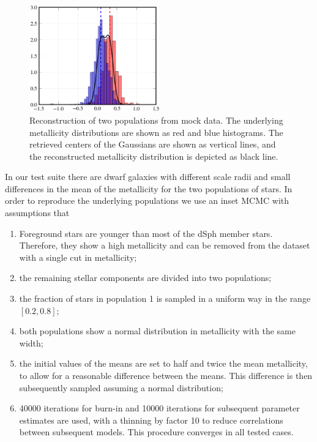 \begin{figure}
    \begin{center}
        \includegraphics[width=0.5\textwidth]{fig/pymcmetals}
        \caption{Reconstruction of two populations from mock data. The
          underlying metallicity distributions are shown as red and
          blue histograms. The retrieved centers of the Gaussians are
          shown as vertical lines, and the reconstructed metallicity
          distribution is depicted as black line.}
        \label{fig:pymcmetal}
    \end{center}
\end{figure}

In our test suite there are dwarf galaxies with different scale radii
and small differences in the mean of the metallicity for the two
populations of stars. In order to reproduce the underlying populations
we use an inset MCMC with assumptions that

\begin{enumerate}
\item Foreground stars are younger than most of the dSph member
  stars. Therefore, they show a high metallicity and can be removed
  from the dataset with a single cut in metallicity;
\item the remaining stellar components are divided into two
  populations;
\item the fraction of stars in population 1 is sampled in a uniform
  way in the range $[0.2,0.8]$;
\item both populations show a normal distribution in metallicity with
  the same width;
\item the initial values of the means are set to half and twice the
  mean metallicity, to allow for a reasonable difference between the
  means. This difference is then subsequently sampled assuming a
  normal distribution;
\item 40000 iterations for burn-in and 10000 iterations for subsequent
  parameter estimates are used, with a thinning by factor 10 to reduce
  correlations between subsequent models. This procedure converges in
  all tested cases.
\end{enumerate}

